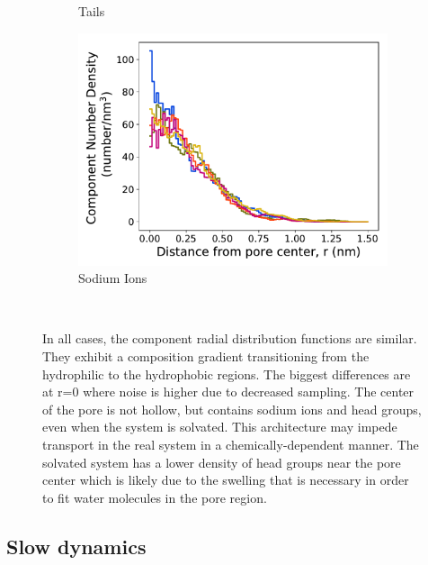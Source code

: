 \documentclass[journal=jpcbfk,manuscript=article]{achemso}
\begin{document}
\begin{figure}[!htb]
\begin{subfigure}{0.32\textwidth}
        \caption{Tails}
        \label{fig:tails_regional_density}
  \end{subfigure}
  \begin{subfigure}{0.32\textwidth}
        \includegraphics[width=1\linewidth]{sodium_density.pdf}
        \caption{Sodium Ions}
        \label{fig:sodium_regional_density}
  \end{subfigure}
  \caption{In all cases, the component radial distribution functions are similar. 
      They exhibit a composition gradient transitioning from the hydrophilic to the hydrophobic
	  regions. The biggest differences are at r=0 where noise is higher due to 
	  decreased sampling. The center of the pore is not hollow, but contains sodium ions and 
	  head groups, even when the system is solvated. This architecture may impede transport in 
	  the real system in a chemically-dependent manner. 
          The solvated system has a lower density of head groups near the 
	  pore center which is likely due to the swelling that is necessary in order to fit water
	  molecules in the pore region.}~\label{fig:overlaid_densities}
  \end{figure}

  \subsection{Slow dynamics}\label{section:slow_dynamics}
  
\end{document}
